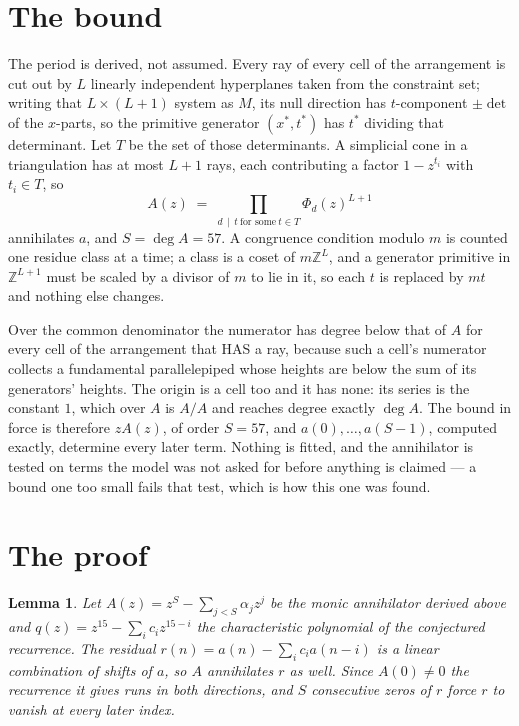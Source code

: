 \documentclass[11pt,a4paper]{article}
\theoremstyle{plain}
\newtheorem{lemma}[theorem]{Lemma}
\theoremstyle{definition}
\begin{document}
\section{The bound}

The period is derived, not assumed. Every ray of every cell of the arrangement is cut out by
$L$ linearly independent hyperplanes taken from the constraint set; writing that $L\times(L+1)$
system as $M$, its null direction has $t$-component $\pm\det$ of the $x$-parts, so the
primitive generator $(x^*,t^*)$ has $t^*$ dividing that determinant. Let $T$ be the set of
those determinants. A simplicial cone in a triangulation has at most $L+1$ rays, each
contributing a factor $1-z^{t_i}$ with $t_i\in T$, so
\[
A(z)\;=\;\prod_{d\,\mid\,t\ \text{for some}\ t\in T}\Phi_d(z)^{L+1}
\]
annihilates $a$, and $S=\deg A=57$. A congruence condition modulo $m$ is counted one residue
class at a time; a class is a coset of $m\mathbb{Z}^L$, and a generator primitive in
$\mathbb{Z}^{L+1}$ must be scaled by a divisor of $m$ to lie in it, so each $t$ is replaced
by $mt$ and nothing else changes.

Over the common denominator the numerator has degree below that of $A$ for every cell of the
arrangement that HAS a ray, because such a cell's numerator collects a fundamental
parallelepiped whose heights are below the sum of its generators' heights. The origin is a cell
too and it has none: its series is the constant $1$, which over $A$ is $A/A$ and reaches degree
exactly $\deg A$. The bound in force is therefore $zA(z)$, of order $S=57$, and
$a(0),\dots,a(S-1)$, computed exactly, determine every later term. Nothing is fitted, and the
annihilator is tested on terms the model was not asked for before anything is claimed --- a
bound one too small fails that test, which is how this one was found.

\section{The proof}

\begin{lemma}\label{lem:crit}
Let $A(z)=z^S-\sum_{j<S}\alpha_jz^{j}$ be the monic annihilator derived above and
$q(z)=z^{15}-\sum_ic_iz^{15-i}$ the characteristic polynomial of the conjectured
recurrence. The residual $r(n)=a(n)-\sum_ic_ia(n-i)$ is a linear combination of shifts of $a$,
so $A$ annihilates $r$ as well. Since $A(0)\ne0$ the recurrence it gives runs in both
directions, and $S$ consecutive zeros of $r$ force $r$ to vanish at every later index.
\end{lemma}
\end{document}
